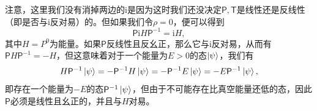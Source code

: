 注意，这里我们没有消掉两边的$\mathrm{i}$是因为这时我们还没决定$\mathsf{P} ,\mathsf{T}$是线性还是反线性（即是否与$\mathrm{i}$反对易）的。但如果我们令$\rho =0$，便可以得到
\begin{equation*}
	\mathsf{P}\mathrm{i} H\mathsf{P}^{-1} =\mathrm{i} H,
\end{equation*}
其中$H=P^{0}$为能量。如果$\mathsf{P}$反线性且反幺正，那么它与$\mathrm{i}$反对易，从而有$\mathsf{P} H\mathsf{P}^{-1} =-H$，但这意味着对于一个能量为$E >0$的态$\ket{\psi }$，我们有
\begin{equation*}
	H\mathsf{P}^{-1}\ket{\psi } =-\mathsf{P}^{-1} H\ket{\psi } =-\mathsf{P}^{-1} E\ket{\psi } =-E\mathsf{P}^{-1}\ket{\psi } ,
\end{equation*}
即存在一个能量为$-E$的态$\mathsf{P}^{-1}\ket{\psi }$，但由于不可能存在比真空能量还低的态，因此$\mathsf{P}$必须是线性且幺正的，并且与$H$对易。

